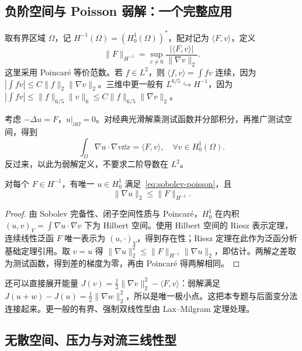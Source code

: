 \subsection{负阶空间与 Poisson 弱解：一个完整应用}

取有界区域 $\Omega$，记 $H^{-1}(\Omega)=(H^1_0(\Omega))^*$，配对记为 $\langle F,v\rangle$，定义
\[
 \|F\|_{H^{-1}}=\sup_{v\ne0}\frac{|\langle F,v\rangle|}{\|\nabla v\|_2}.
\]
这里采用 Poincar\'e 等价范数。若 $f\in L^2$，则 $\langle f,v\rangle=\int fv$ 连续，因为 $|\int fv|\le C\|f\|_2\|\nabla v\|_2$。三维中更一般有 $L^{6/5}\hookrightarrow H^{-1}$，因为 $|\int fv|\le\|f\|_{6/5}\|v\|_6\le C\|f\|_{6/5}\|\nabla v\|_2$。

考虑 $-\Delta u=F$，$u|_{\partial\Omega}=0$。对经典光滑解乘测试函数并分部积分，再推广测试空间，得到
\begin{equation}
 \int_\Omega\nabla u\cdot\nabla v\dd x=\langle F,v\rangle,
 \quad\forall v\in H^1_0(\Omega).
 \label{eq:sobolev-poisson}
\end{equation}
反过来，以此为弱解定义，不要求二阶导数在 $L^2$。

\begin{theorem}
对每个 $F\in H^{-1}$，有唯一 $u\in H^1_0$ 满足~\eqref{eq:sobolev-poisson}，且
\[
 \|\nabla u\|_2\le\|F\|_{H^{-1}}.
\]
\end{theorem}
\begin{proof}
由 Sobolev 完备性、闭子空间性质与 Poincar\'e，$H^1_0$ 在内积 $(u,v)_V=\int\nabla u\cdot\nabla v$ 下为 Hilbert 空间。使用 Hilbert 空间的 Riesz 表示定理，连续线性泛函 $F$ 唯一表示为 $(u,\cdot)_V$，得到存在性；Riesz 定理在此作为泛函分析基础定理引用。取 $v=u$ 得 $\|\nabla u\|_2^2\le\|F\|_{H^{-1}}\|\nabla u\|_2$，即估计。两解之差取为测试函数，得到差的梯度为零，再由 Poincar\'e 得两解相同。
\end{proof}

还可以直接展开能量 $J(v)=\frac12\|\nabla v\|_2^2-\langle F,v\rangle$：弱解满足
$J(u+w)-J(u)=\frac12\|\nabla w\|_2^2$，所以是唯一极小点。这把本专题与后面变分法连接起来。更一般的有界、强制双线性型由 Lax--Milgram 定理处理。

\subsection{无散空间、压力与对流三线性型}

